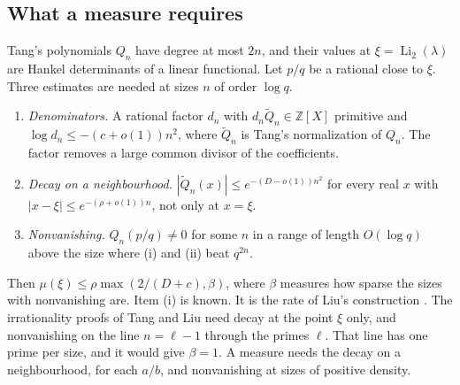 \documentclass[11pt]{amsart}
\theoremstyle{definition}
\theoremstyle{remark}
\numberwithin{equation}{section}
\newcommand{\Z}{\mathbb Z}
\newcommand{\Li}{\operatorname{Li}}
\begin{document}
\subsection{What a measure requires}\label{ssec:require}
Tang's polynomials $Q_n$ have degree at most $2n$, and their values at $\xi=\Li_2(\lambda)$ are Hankel determinants of
a linear functional. Let $p/q$ be a rational close to $\xi$. Three estimates are needed at sizes $n$ of order
$\log q$.
\begin{enumerate}[label=(\roman*)]
\item \emph{Denominators.} A rational factor $d_n$ with $d_n\tilde Q_n\in\Z[X]$ primitive and $\log d_n\le-(c+o(1))n^2$,
 where $\tilde Q_n$ is Tang's normalization of $Q_n$.
 The factor removes a large common divisor of the coefficients.
\item \emph{Decay on a neighbourhood.} $|\tilde Q_n(x)|\le e^{-(D-o(1))n^2}$ for every real $x$ with
 $|x-\xi|\le e^{-(\rho+o(1))n}$, not only at $x=\xi$.
\item \emph{Nonvanishing.} $Q_n(p/q)\ne0$ for some $n$ in a range of length $O(\log q)$ above the size where (i) and
 (ii) beat $q^{2n}$.
\end{enumerate}
Then $\mu(\xi)\le\rho\max(2/(D+c),\beta)$, where $\beta$ measures how sparse the sizes with nonvanishing are. Item
(i) is known. It is the rate of Liu's construction \cite{LiuLi2Rational,TanZhang26}. The irrationality proofs of
Tang and Liu need decay at the point $\xi$ only, and nonvanishing on the line $n=\ell-1$ through the primes $\ell$. That
line has one prime per size, and it would give $\beta=1$. A measure needs the decay on a neighbourhood, for each
$a/b$, and nonvanishing at sizes of positive density.
\end{document}
